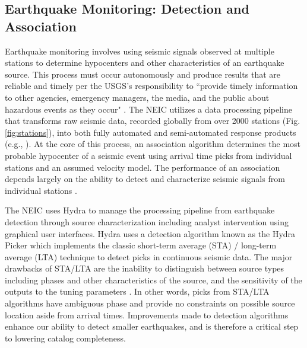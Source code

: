 \documentclass[12p]{article}
\begin{document}
\subsection{Earthquake Monitoring: Detection and Association}

Earthquake monitoring involves using seismic signals observed at multiple stations to determine hypocenters and other
characteristics of an earthquake source. This process must occur autonomously and produce results that are reliable and
timely per the USGS's responsibility to ``provide timely information to other agencies, emergency managers, the media,
and the public about hazardous events as they occur" \citep{Holmes2013}. The NEIC utilizes a data processing pipeline
that transforms raw seismic data, recorded globally from over 2000 stations (Fig. \ref{fig:stations}), into both fully
automated and semi-automated response products (e.g., \citet{Thompson2019, Michael2019}). At the core of this process,
an association algorithm determines the most probable hypocenter of a seismic event using arrival time picks
from individual stations and an assumed velocity model. The performance of an association depends largely on the ability
to detect and characterize seismic signals from individual stations \citep{Yeck2019}.

The NEIC uses Hydra \citep{Patton2016} to manage the processing pipeline from earthquake detection through source
characterization including analyst intervention using graphical user interfaces. Hydra uses a detection algorithm known
as the Hydra Picker which implements the classic short-term average (STA) / long-term average (LTA) \citep{Lee1981}
technique to detect picks in continuous seismic data. The major drawbacks of STA/LTA are the inability to distinguish
between source types including phases and other characteristics of the source, and the sensitivity of the outputs to the
tuning parameters \citep{Patton2016}. In other words, picks from STA/LTA algorithms have ambiguous phase and provide no
constraints on possible source location aside from arrival times. Improvements made to detection algorithms enhance our
ability to detect smaller earthquakes, and is therefore a critical step to lowering catalog completeness.
\end{document}
